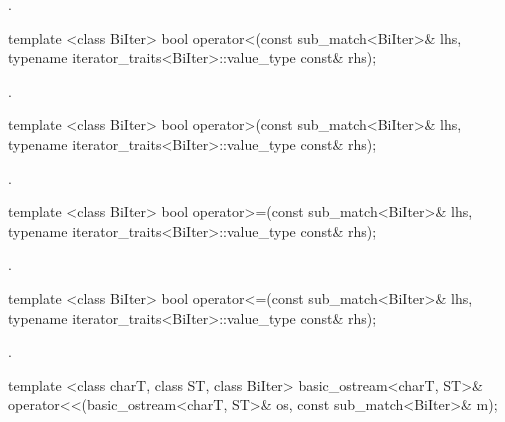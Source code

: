 \begin{itemdescr}
\pnum
\returns {}.
\end{itemdescr}

%
\begin{itemdecl}
template <class BiIter> 
  bool operator<(const sub_match<BiIter>& lhs, 
                 typename iterator_traits<BiIter>::value_type const& rhs); 
\end{itemdecl}

\begin{itemdescr}
\pnum
\returns {}.
\end{itemdescr}

%
\begin{itemdecl}
template <class BiIter> 
  bool operator>(const sub_match<BiIter>& lhs, 
                 typename iterator_traits<BiIter>::value_type const& rhs); 
\end{itemdecl}

\begin{itemdescr}
\pnum
\returns {}.
\end{itemdescr}

%
\begin{itemdecl}
template <class BiIter> 
  bool operator>=(const sub_match<BiIter>& lhs, 
                  typename iterator_traits<BiIter>::value_type const& rhs); 
\end{itemdecl}

\begin{itemdescr}
\pnum
\returns {}.
\end{itemdescr}

%
\begin{itemdecl}
template <class BiIter> 
  bool operator<=(const sub_match<BiIter>& lhs, 
                  typename iterator_traits<BiIter>::value_type const& rhs); 
\end{itemdecl}

\begin{itemdescr}
\pnum
\returns {}.
\end{itemdescr}

%
%
\begin{itemdecl}
template <class charT, class ST, class BiIter>
  basic_ostream<charT, ST>&
  operator<<(basic_ostream<charT, ST>& os, const sub_match<BiIter>& m); 
\end{itemdecl}

